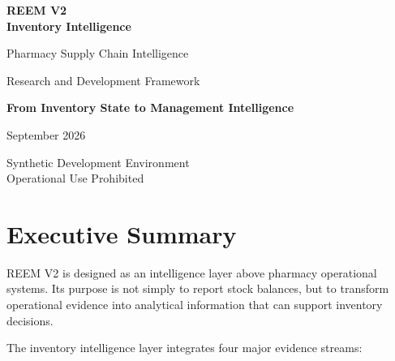 \documentclass[11pt,a4paper]{article}
\begin{document}
\begin{titlepage}

\centering

\vspace*{1.2cm}

{\color{titleColor}\Huge\bfseries
REEM V2\\[0.3cm]
Inventory Intelligence
\par}

\vspace{0.5cm}

{\color{blueColor}\Large
Pharmacy Supply Chain Intelligence
\par}

\vspace{0.3cm}

{\large
Research and Development Framework
\par}

\vspace{1.2cm}

\begin{tcolorbox}[
    colframe=titleColor,
    colback=white,
    width=0.90\textwidth,
    arc=3mm
]
\centering
\large
\textbf{From Inventory State to Management Intelligence}
\end{tcolorbox}

\vfill

{\large
September 2026
\par}

\vspace{0.4cm}

{\small
Synthetic Development Environment\\
Operational Use Prohibited
\par}

\end{titlepage}

\section{Executive Summary}

REEM V2 is designed as an intelligence layer above pharmacy
operational systems. Its purpose is not simply to report stock
balances, but to transform operational evidence into analytical
information that can support inventory decisions.

The inventory intelligence layer integrates four major evidence
streams:
\end{document}
